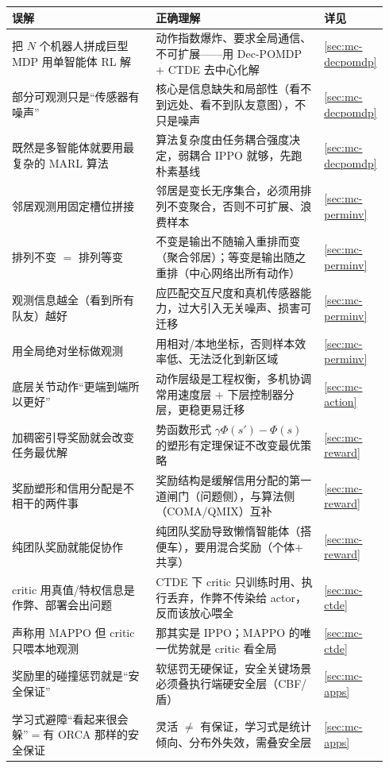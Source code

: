 \begin{table}[H]\centering\small
\begin{tabular}{p{0.40\linewidth}p{0.46\linewidth}p{0.08\linewidth}}
\toprule
误解 & 正确理解 & 详见 \\
\midrule
把 $N$ 个机器人拼成巨型 MDP 用单智能体 RL 解 & 动作指数爆炸、要求全局通信、不可扩展——用 Dec-POMDP $+$ CTDE 去中心化解 & \cref{sec:mc-decpomdp} \\
部分可观测只是“传感器有噪声” & 核心是信息缺失和局部性（看不到远处、看不到队友意图），不只是噪声 & \cref{sec:mc-decpomdp} \\
既然是多智能体就要用最复杂的 MARL 算法 & 算法复杂度由任务耦合强度决定，弱耦合 IPPO 就够，先跑朴素基线 & \cref{sec:mc-decpomdp} \\
邻居观测用固定槽位拼接 & 邻居是变长无序集合，必须用排列不变聚合，否则不可扩展、浪费样本 & \cref{sec:mc-perminv} \\
排列不变 $=$ 排列等变 & 不变是输出不随输入重排而变（聚合邻居）；等变是输出随之重排（中心网络出所有动作） & \cref{sec:mc-perminv} \\
观测信息越全（看到所有队友）越好 & 应匹配交互尺度和真机传感器能力，过大引入无关噪声、损害可迁移 & \cref{sec:mc-perminv} \\
用全局绝对坐标做观测 & 用相对/本地坐标，否则样本效率低、无法泛化到新区域 & \cref{sec:mc-perminv} \\
底层关节动作“更端到端所以更好” & 动作层级是工程权衡，多机协调常用速度层 $+$ 下层控制器分层，更稳更易迁移 & \cref{sec:mc-action} \\
加稠密引导奖励就会改变任务最优解 & 势函数形式 $\gamma\Phi(s')-\Phi(s)$ 的塑形有定理保证不改变最优策略 & \cref{sec:mc-reward} \\
奖励塑形和信用分配是不相干的两件事 & 奖励结构是缓解信用分配的第一道闸门（问题侧），与算法侧（COMA/QMIX）互补 & \cref{sec:mc-reward} \\
纯团队奖励就能促协作 & 纯团队奖励导致懒惰智能体（搭便车），要用混合奖励（个体$+$共享） & \cref{sec:mc-reward} \\
critic 用真值/特权信息是作弊、部署会出问题 & CTDE 下 critic 只训练时用、执行丢弃，作弊不传染给 actor，反而该放心喂全 & \cref{sec:mc-ctde} \\
声称用 MAPPO 但 critic 只喂本地观测 & 那其实是 IPPO；MAPPO 的唯一优势就是 critic 看全局 & \cref{sec:mc-ctde} \\
奖励里的碰撞惩罚就是“安全保证” & 软惩罚无硬保证，安全关键场景必须叠执行端硬安全层（CBF/盾） & \cref{sec:mc-apps} \\
学习式避障“看起来很会躲”$=$有 ORCA 那样的安全保证 & 灵活 $\neq$ 有保证，学习式是统计倾向、分布外失效，需叠安全层 & \cref{sec:mc-apps} \\

\end{tabular}
\end{table}
